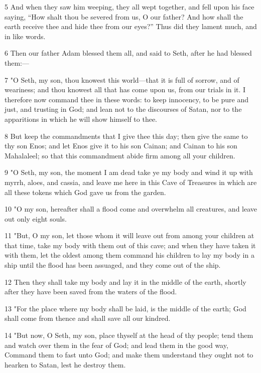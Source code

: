 \par 5 And when they saw him weeping, they all wept together, and fell upon his face saying, “How shalt thou be severed from us, O our father? And how shall the earth receive thee and hide thee from our eyes?” Thus did they lament much, and in like words.

\par 6 Then our father Adam blessed them all, and said to Seth, after he had blessed them:—

\par 7 "O Seth, my son, thou knowest this world—that it is full of sorrow, and of weariness; and thou knowest all that has come upon us, from our trials in it. I therefore now command thee in these words: to keep innocency, to be pure and just, and trusting in God; and lean not to the discourses of Satan, nor to the apparitions in which he will show himself to thee.

\par 8 But keep the commandments that I give thee this day; then give the same to thy son Enos; and let Enos give it to his son Cainan; and Cainan to his son Mahalaleel; so that this commandment abide firm among all your children.

\par 9 "O Seth, my son, the moment I am dead take ye my body and wind it up with myrrh, aloes, and cassia, and leave me here in this Cave of Treasures in which are all these tokens which God gave us from the garden.

\par 10 "O my son, hereafter shall a flood come and overwhelm all creatures, and leave out only eight souls.

\par 11 "But, O my son, let those whom it will leave out from among your children at that time, take my body with them out of this cave; and when they have taken it with them, let the oldest among them command his children to lay my body in a ship until the flood has been assuaged, and they come out of the ship.

\par 12 Then they shall take my body and lay it in the middle of the earth, shortly after they have been saved from the waters of the flood.

\par 13 "For the place where my body shall be laid, is the middle of the earth; God shall come from thence and shall save all our kindred.

\par 14 "But now, O Seth, my son, place thyself at the head of thy people; tend them and watch over them in the fear of God; and lead them in the good way, Command them to fast unto God; and make them understand they ought not to hearken to Satan, lest he destroy them.

